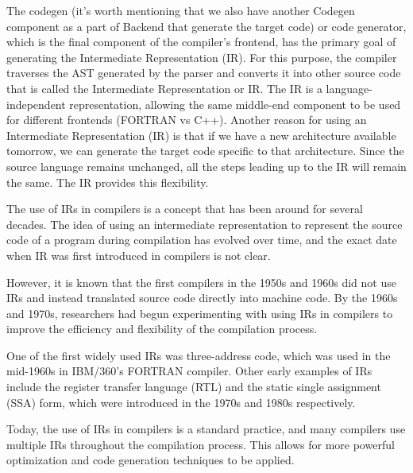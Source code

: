 
The codegen (it’s worth mentioning that we also have another Codegen component as a part of Backend that generate the target code) or code generator, which is the final component of the compiler’s frontend, has the primary goal of generating the Intermediate Representation (IR). For this purpose, the compiler traverses the AST generated by the parser and converts it into other source code that is called the Intermediate Representation or IR. The IR is a language-independent representation, allowing the same middle-end component to be used for different frontends (FORTRAN vs C++). Another reason for using an Intermediate Representation (IR) is that if we have a new architecture available tomorrow, we can generate the target code specific to that architecture. Since the source language remains unchanged, all the steps leading up to the IR will remain the same. The IR provides this flexibility.

The use of IRs in compilers is a concept that has been around for several decades. The idea of using an intermediate representation to represent the source code of a program during compilation has evolved over time, and the exact date when IR was first introduced in compilers is not clear.

However, it is known that the first compilers in the 1950s and 1960s did not use IRs and instead translated source code directly into machine code. By the 1960s and 1970s, researchers had begun experimenting with using IRs in compilers to improve the efficiency and flexibility of the compilation process.

One of the first widely used IRs was three-address code, which was used in the mid-1960s in IBM/360’s FORTRAN compiler. Other early examples of IRs include the register transfer language (RTL) and the static single assignment (SSA) form, which were introduced in the 1970s and 1980s respectively.

Today, the use of IRs in compilers is a standard practice, and many compilers use multiple IRs throughout the compilation process. This allows for more powerful optimization and code generation techniques to be applied.




































